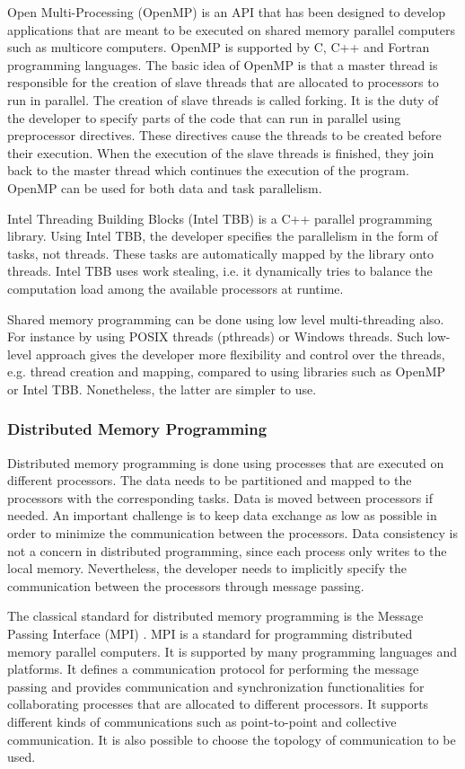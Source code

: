 Open Multi-Processing (OpenMP) \cite{openmp} is an API that has been designed to develop applications that are meant to be executed on shared memory parallel computers such as multicore computers. OpenMP is supported by C, C++ and Fortran programming languages. The basic idea of OpenMP is that a master thread is responsible for the creation of slave threads that are allocated to processors to run in parallel. The creation of slave threads is called forking. It is the duty of the developer to specify parts of the code that can run in parallel using preprocessor directives. These directives cause the threads to be created before their execution. When the execution of the slave threads is finished, they join back to the master thread which continues the execution of the program. OpenMP can be used for both data and task parallelism.

Intel Threading Building Blocks (Intel TBB) is a C++ parallel programming library. Using Intel TBB, the developer specifies the parallelism in the form of tasks, not threads. These tasks are automatically mapped by the library onto threads. Intel TBB uses work stealing, i.e. it dynamically tries to balance the computation load among the available processors at runtime.

Shared memory programming can be done using low level multi-threading also. For instance by using POSIX threads (pthreads) or Windows threads. Such low-level approach gives the developer more flexibility and control over the threads, e.g. thread creation and mapping, compared to using libraries such as OpenMP or Intel TBB. Nonetheless, the latter are simpler to use. 

\subsubsection{Distributed Memory Programming}

Distributed memory programming is done using processes that are executed on different processors. The data needs to be partitioned and mapped to the processors with the corresponding tasks. Data is moved between processors if needed. An important challenge is to keep data exchange as low as possible in order to minimize the communication between the processors. Data consistency is not a concern in distributed programming, since each process only writes to the local memory. Nevertheless, the developer needs to implicitly specify the communication between the processors through message passing.  

The classical standard for distributed memory programming is the Message Passing Interface (MPI) \cite{mpi}. MPI is a standard for programming distributed memory parallel computers. It is supported by many programming languages and platforms. It defines a communication protocol for performing the message passing and provides communication and synchronization functionalities for collaborating processes that are allocated to different processors. It supports different kinds of communications such as point-to-point and collective communication. It is also possible to choose the topology of communication to be used.

